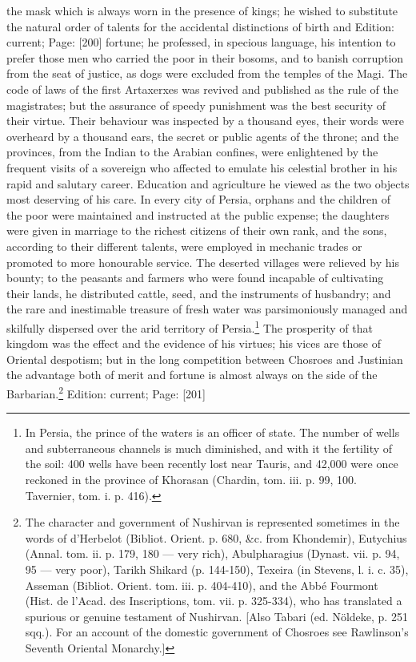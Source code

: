 the mask which is always worn in the presence of kings; he wished to substitute the natural order of talents for the accidental distinctions of birth and Edition: current; Page: [200] fortune; he professed, in specious language, his intention to prefer those men who carried the poor in their bosoms, and to banish corruption from the seat of justice, as dogs were excluded from the temples of the Magi. The code of laws of the first Artaxerxes was revived and published as the rule of the magistrates; but the assurance of speedy punishment was the best security of their virtue. Their behaviour was inspected by a thousand eyes, their words were overheard by a thousand ears, the secret or public agents of the throne; and the provinces, from the Indian to the Arabian confines, were enlightened by the frequent visits of a sovereign who affected to emulate his celestial brother in his rapid and salutary career. Education and agriculture he viewed as the two objects most deserving of his care. In every city of Persia, orphans and the children of the poor were maintained and instructed at the public expense; the daughters were given in marriage to the richest citizens of their own rank, and the sons, according to their different talents, were employed in mechanic trades or promoted to more honourable service. The deserted villages were relieved by his bounty; to the peasants and farmers who were found incapable of cultivating their lands, he distributed cattle, seed, and the instruments of husbandry; and the rare and inestimable treasure of fresh water was parsimoniously managed and skilfully dispersed over the arid territory of Persia.\footnote{In Persia, the prince of the waters is an officer of state. The number of wells and subterraneous channels is much diminished, and with it the fertility of the soil: 400 wells have been recently lost near Tauris, and 42,000 were once reckoned in the province of Khorasan (Chardin, tom. iii. p. 99, 100. Tavernier, tom. i. p. 416).} The prosperity of that kingdom was the effect and the evidence of his virtues; his vices are those of Oriental despotism; but in the long competition between Chosroes and Justinian the advantage both of merit and fortune is almost always on the side of the Barbarian.\footnote{The character and government of Nushirvan is represented sometimes in the words of d\texthebrew{}’Herbelot (Bibliot. Orient. p. 680, \&c. from Khondemir), Eutychius (Annal. tom. ii. p. 179, 180 \texthebrew{—} very rich), Abulpharagius (Dynast. vii. p. 94, 95 \texthebrew{—} very poor), Tarikh Shikard (p. 144-150), Texeira (in Stevens, l. i. c. 35), Asseman (Bibliot. Orient. tom. iii. p. 404-410), and the Abbé Fourmont (Hist. de l\texthebrew{}’Acad. des Inscriptions, tom. vii. p. 325-334), who has translated a spurious or genuine testament of Nushirvan. [Also Tabari (ed. Nöldeke, p. 251 sqq.). For an account of the domestic government of Chosroes see Rawlinson\texthebrew{}’s Seventh Oriental Monarchy.]}
Edition: current; Page: [201]

